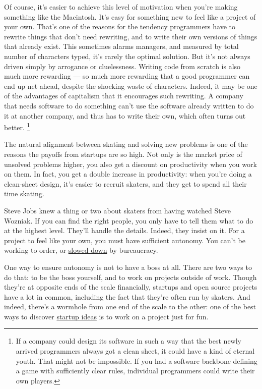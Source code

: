\documentclass[12pt]{book}
\begin{document}
Of course, it's easier to achieve this level of motivation when you're
making something like the Macintosh. It's easy for something new to feel
like a project of your own. That's one of the reasons for the tendency
programmers have to rewrite things that don't need rewriting, and to
write their own versions of things that already exist. This sometimes
alarms managers, and measured by total number of characters typed, it's
rarely the optimal solution. But it's not always driven simply by
arrogance or cluelessness. Writing code from scratch is also much more
rewarding --- so much more rewarding that a good programmer can end up
net ahead, despite the shocking waste of characters. Indeed, it may be
one of the advantages of capitalism that it encourages such rewriting. A
company that needs software to do something can't use the software
already written to do it at another company, and thus has to write their
own, which often turns out better. \footnote{If a company could design its software in such a way that the
best newly arrived programmers always got a clean sheet, it could have a
kind of eternal youth. That might not be impossible. If you had a
software backbone defining a game with sufficiently clear rules,
individual programmers could write their own players.}

The natural alignment between skating and solving new problems is one of
the reasons the payoffs from startups are so high. Not only is the
market price of unsolved problems higher, you also get a discount on
productivity when you work on them. In fact, you get a double increase
in productivity: when you're doing a clean-sheet design, it's easier to
recruit skaters, and they get to spend all their time skating.

Steve Jobs knew a thing or two about skaters from having watched Steve
Wozniak. If you can find the right people, you only have to tell them
what to do at the highest level. They'll handle the details. Indeed,
they insist on it. For a project to feel like your own, you must have
sufficient autonomy. You can't be working to order, or
\href{artistsship.html}{slowed down} by bureaucracy.

One way to ensure autonomy is not to have a boss at all. There are two
ways to do that: to be the boss yourself, and to work on projects
outside of work. Though they're at opposite ends of the scale
financially, startups and open source projects have a lot in common,
including the fact that they're often run by skaters. And indeed,
there's a wormhole from one end of the scale to the other: one of the
best ways to discover \href{startupideas.html}{startup ideas} is to work
on a project just for fun.
\end{document}
